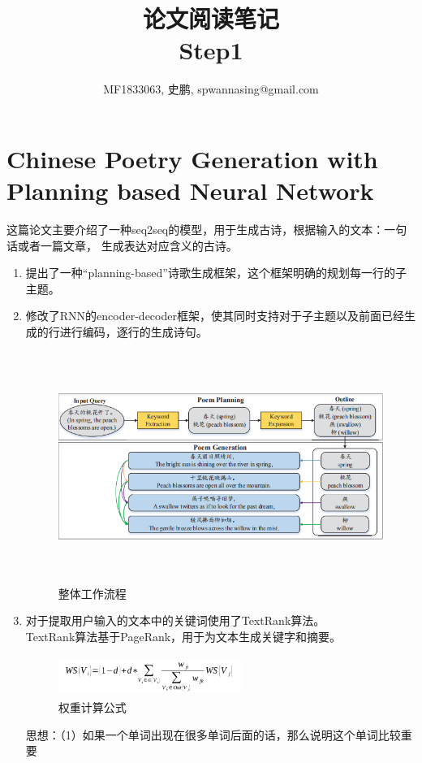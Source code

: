 \documentclass[a4paper,UTF8]{article}
\numberwithin{equation}{section}
\begin{document}
\title{论文阅读笔记\\
Step1}
\author{MF1833063, 史鹏, spwannasing@gmail.com}
\maketitle
\newpage
\section{Chinese Poetry Generation with Planning based Neural Network}
这篇论文主要介绍了一种seq2seq的模型，用于生成古诗，根据输入的文本：一句话或者一篇文章，
生成表达对应含义的古诗。
\begin{enumerate}
	\item 提出了一种“planning-based”诗歌生成框架，这个框架明确的规划每一行的子主题。
	\item 修改了RNN的encoder-decoder框架，使其同时支持对于子主题以及前面已经生成的行进行编码，逐行的生成诗句。 
    \begin{figure}[htbp]
        \centering
        \includegraphics[height=7.5cm,width=15cm]{framework.jpg}
        \caption{整体工作流程}
    \end{figure}
    \item   对于提取用户输入的文本中的关键词使用了TextRank算法。\\
    TextRank算法基于PageRank，用于为文本生成关键字和摘要。\\
    \begin{figure}[H]
        \centering
        \includegraphics[height=1.3cm,width=6cm]{textrank.png}
        \caption{权重计算公式}
    \end{figure}
    思想：（1）如果一个单词出现在很多单词后面的话，那么说明这个单词比较重要\\

\end{enumerate}
\end{document}

